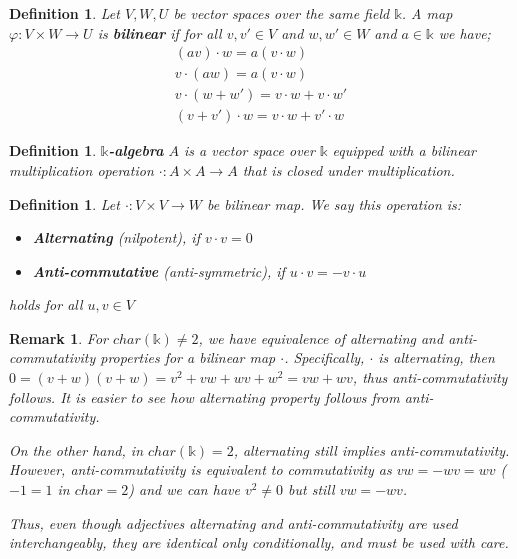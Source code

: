 \documentclass[12pt]{article}
\newtheorem{definition}[theorem]{Definition}
\newtheorem{remark}[theorem]{Remark}
\numberwithin{theorem}{section}
\numberwithin{equation}{theorem}
\newcommand{\kk}{\mathds{k}}
\begin{document}
\begin{definition}
    Let $V, W, U$ be vector spaces over the same field $\kk$. A map $\varphi : V \times W \to U$ is \textbf{bilinear} if for all $v, v' \in V$ and $w, w' \in W$ and $a \in \kk$ we have;
    \begin{gather*}
        (av) \cdot w = a(v \cdot w)\\
        v \cdot (aw) = a(v \cdot w)\\
        v \cdot (w + w') = v \cdot w + v \cdot w'\\
        (v + v') \cdot w = v \cdot w + v' \cdot w
    \end{gather*}
\end{definition}
\begin{definition}
    $\kk$\textbf{-algebra} $A$ is a vector space over $\kk$ equipped with a bilinear multiplication operation $\cdot : A \times A \to A$ that is closed under multiplication.
\end{definition}
\begin{definition}
    Let $\cdot : V \times V \to W$ be bilinear map. We say this operation is:
    \begin{itemize}
        \item \textbf{Alternating} (nilpotent), if $v \cdot v = 0$
        \item \textbf{Anti-commutative} (anti-symmetric), if $u \cdot v = -v \cdot u$
    \end{itemize}
    holds for all $u, v \in V$
\end{definition}
\begin{remark}\label{rmk:altanti}
    For $char(\kk) \neq 2$, we have equivalence of alternating and anti-commutativity properties for a bilinear map $\cdot$. Specifically, $\cdot$ is alternating, then $0 = (v + w)(v + w) = v^2 + vw + wv + w^2 = vw + wv$, thus anti-commutativity follows. It is easier to see how alternating property follows from anti-commutativity. 

    On the other hand, in $char(\kk) = 2$, alternating still implies anti-commutativity. However, anti-commutativity is equivalent to commutativity as $vw = -wv = wv$ ($-1 = 1$ in $char = 2$) and we can have $v^2 \neq 0$ but still $vw = -wv$.

    Thus, even though adjectives alternating and anti-commutativity are used interchangeably, they are identical only conditionally, and must be used with care.
\end{remark}
\end{document}
